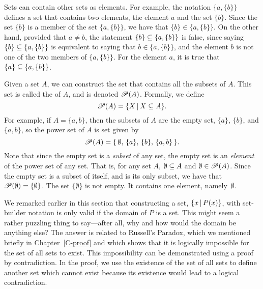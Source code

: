 Sets can contain other sets as elements.
For example, the notation $\{a,\{b\}\}$ defines a set that contains two elements, the element $a$ and the set $\{b\}$.
Since the set $\{b\}$ is a member of the set $\{a,\{b\}\}$, we have that $\{b\}\in\{a,\{b\}\}$.
On the other hand, provided that $a\not=b$, the statement $\{b\}\subseteq\{a,\{b\}\}$ is false, since saying $\{b\}\subseteq\{a,\{b\}\}$ is equivalent to saying that $b\in\{a,\{b\}\}$, and the element $b$ is not one of the two members of $\{a,\{b\}\}$.
For the element $a$, it is true that $\{a\}\subseteq\{a,\{b\}\}$.

Given a set $A$, we can construct the set that contains all the subsets of $A$.
This set is called the  of $A$, and is denoted ${\mathscr P}(A)$.
Formally, we define
\[{\mathscr P}(A)=\{X\,|\, X\subseteq A\}.\]
For example, if $A=\{a,b\}$, then the subsets of $A$ are the empty set, $\{a\}$, $\{b\}$, and $\{a,b\}$, so the power set of $A$ is set given by
\[{\mathscr P}(A) = \{\,\emptyset,\,\{a\},\,\{b\},\,\{a,b\}\,\}.\]
Note that since the empty set is a \emph{subset} of any set, the empty set is an \emph{element} of the power set of any set.
That is, for any set $A$, $\emptyset\subseteq A$ and $\emptyset\in{\mathscr P}(A)$.
Since the empty set is a subset of itself, and is its only subset, we have that ${\mathscr P}(\emptyset) = \{\emptyset\}$.
The set $\{\emptyset\}$ is not empty.
It contains one element, namely~$\emptyset$.


\medbreak

We remarked earlier in this section that constructing a set, $\{x \,|\, P(x)\}$, with set-builder notation is only valid if the domain of $P$ is a set.
This might seem a rather puzzling thing to say---after all, why and how would the domain be anything else?
The answer is related to Russell's Paradox, which we mentioned briefly in Chapter~\ref{C-proof} and which shows that it is logically impossible for the set of all sets to exist.
This impossibility can be demonstrated using a proof by contradiction.
In the proof, we use the existence of the set of all sets to define another set which cannot exist because its existence would lead to a logical contradiction.

